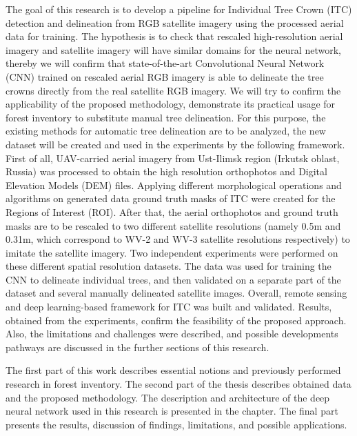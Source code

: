 The goal of this research is to develop a pipeline for Individual Tree Crown (\gls{ITC}) detection and delineation from RGB satellite imagery using the processed aerial data for training. The hypothesis is to check that rescaled high-resolution aerial imagery and satellite imagery will have similar domains for the neural network, thereby we will confirm that state-of-the-art Convolutional Neural Network (\gls{CNN}) trained on rescaled aerial RGB imagery is able to delineate the tree crowns directly from the real satellite RGB imagery. We will try to confirm the applicability of the proposed methodology, demonstrate its practical usage for forest inventory to substitute manual tree delineation. For this purpose, the existing methods for automatic tree delineation are to be analyzed, the new dataset will be created and used in the experiments by the following framework. First of all, UAV-carried aerial imagery from Ust-Ilimsk region (Irkutsk oblast, Russia) was processed to obtain the high resolution orthophotos and Digital Elevation Models (\gls{DEM}) files. Applying different morphological operations and algorithms on generated data ground truth masks of \gls{ITC} were created for the Regions of Interest (\gls{ROI}). After that, the aerial orthophotos and ground truth masks are to be rescaled to two different satellite resolutions (namely 0.5m and 0.31m, which correspond to WV-2 and WV-3 satellite resolutions respectively) to imitate the satellite imagery. Two independent experiments were performed on these different spatial resolution datasets. The data was used for training the \gls{CNN} to delineate individual trees, and then validated on a separate part of the dataset and several manually delineated satellite images. Overall, remote sensing and deep learning-based framework for \gls{ITC} was built and validated. Results, obtained from the experiments, confirm the feasibility of the proposed approach. Also, the limitations and challenges were described, and possible developments pathways are discussed in the further sections of this research. 

The first part of this work describes essential notions and previously performed research in forest inventory. The second part of the thesis describes obtained data and the proposed methodology. The description and architecture of the deep neural network used in this research is presented in the chapter. The final part presents the results, discussion of findings, limitations, and possible applications.